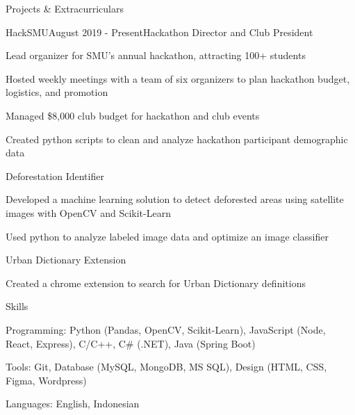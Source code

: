 \documentclass{resume} %
\begin{document}

\begin{rSection}{Projects \& Extracurriculars}
    \begin{rSubsection}{HackSMU}{August 2019 - Present}{Hackathon Director and Club President}{}
        \item Lead organizer for SMU's annual hackathon, attracting 100+ students 
        \item Hosted weekly meetings with a team of six organizers to plan hackathon budget, logistics, and promotion
        \item Managed \$8,000 club budget for hackathon and club events
        \item Created python scripts to clean and analyze hackathon participant demographic data
    \end{rSubsection}
    
    \begin{rSubsection}{Deforestation Identifier}{}{}{}
        \item Developed a machine learning solution to detect deforested areas using satellite images with OpenCV and Scikit-Learn
        \item Used python to analyze labeled image data and optimize an image classifier
    \end{rSubsection}

    \begin{rSubsection}{Urban Dictionary Extension}{}{}{}
        \item Created a chrome extension to search for Urban Dictionary definitions
    \end{rSubsection}
\end{rSection}

\begin{rSection}{Skills}
    \begin{rSubsection}{}{}{}{}
        \item Programming: Python (Pandas, OpenCV, Scikit-Learn), JavaScript (Node, React, Express), C/C++, C\# (.NET), Java (Spring Boot)
        \item Tools: Git, Database (MySQL, MongoDB, MS SQL), Design (HTML, CSS, Figma, Wordpress)
        \item Languages: English, Indonesian
    \end{rSubsection}
\end{rSection}
\end{document}

